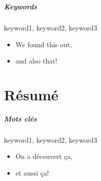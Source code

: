 \chapter*{\abstractname}
\paragraph*{Keywords} keyword1, keyword2, keyword3 
\vspace{1.5\baselineskip}
\begin{itemize}
    \item We found this out,
    \item and also that!
\end{itemize}

\newpage
\chapter*{Résumé}
\paragraph*{Mots clés} keyword1, keyword2, keyword3 
\vspace{1.5\baselineskip}
\begin{itemize}
    \item On a découvert ça,
    \item et aussi ça!
\end{itemize}
